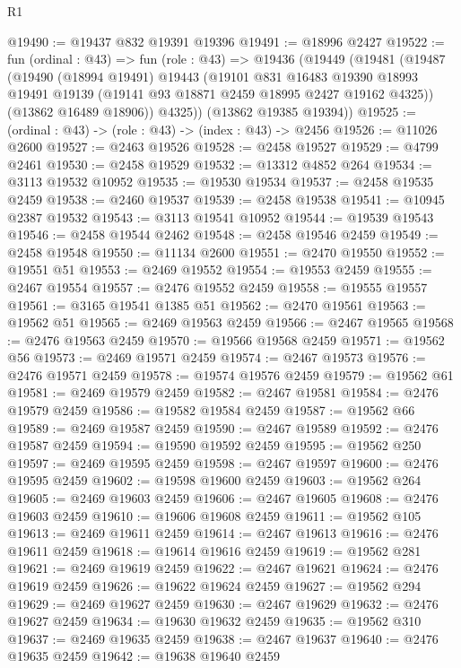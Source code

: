 \begin{lexlean}{R1}
\begin{coremodule}
@19490 := @19437 @832 @19391 @19396
@19491 := @18996 @2427
@19522 := fun (ordinal : @43) =>
  fun (role : @43) =>
  @19436
    (@19449
      (@19481
        (@19487
          (@19490
            (@18994 @19491)
            @19443
            (@19101
              @831
              @16483
              @19390
              @18993
              @19491
              @19139
              (@19141 @93 @18871 @2459 @18995 @2427 @19162 @4325))
            (@13862 @16489 @18906))
          @4325))
      (@13862 @19385 @19394))
@19525 := (ordinal : @43) -> (role : @43) -> (index : @43) -> @2456
@19526 := @11026 @2600
@19527 := @2463 @19526
@19528 := @2458 @19527
@19529 := @4799 @2461
@19530 := @2458 @19529
@19532 := @13312 @4852 @264
@19534 := @3113 @19532 @10952
@19535 := @19530 @19534
@19537 := @2458 @19535 @2459
@19538 := @2460 @19537
@19539 := @2458 @19538
@19541 := @10945 @2387 @19532
@19543 := @3113 @19541 @10952
@19544 := @19539 @19543
@19546 := @2458 @19544 @2462
@19548 := @2458 @19546 @2459
@19549 := @2458 @19548
@19550 := @11134 @2600
@19551 := @2470 @19550
@19552 := @19551 @51
@19553 := @2469 @19552
@19554 := @19553 @2459
@19555 := @2467 @19554
@19557 := @2476 @19552 @2459
@19558 := @19555 @19557
@19561 := @3165 @19541 @1385 @51
@19562 := @2470 @19561
@19563 := @19562 @51
@19565 := @2469 @19563 @2459
@19566 := @2467 @19565
@19568 := @2476 @19563 @2459
@19570 := @19566 @19568 @2459
@19571 := @19562 @56
@19573 := @2469 @19571 @2459
@19574 := @2467 @19573
@19576 := @2476 @19571 @2459
@19578 := @19574 @19576 @2459
@19579 := @19562 @61
@19581 := @2469 @19579 @2459
@19582 := @2467 @19581
@19584 := @2476 @19579 @2459
@19586 := @19582 @19584 @2459
@19587 := @19562 @66
@19589 := @2469 @19587 @2459
@19590 := @2467 @19589
@19592 := @2476 @19587 @2459
@19594 := @19590 @19592 @2459
@19595 := @19562 @250
@19597 := @2469 @19595 @2459
@19598 := @2467 @19597
@19600 := @2476 @19595 @2459
@19602 := @19598 @19600 @2459
@19603 := @19562 @264
@19605 := @2469 @19603 @2459
@19606 := @2467 @19605
@19608 := @2476 @19603 @2459
@19610 := @19606 @19608 @2459
@19611 := @19562 @105
@19613 := @2469 @19611 @2459
@19614 := @2467 @19613
@19616 := @2476 @19611 @2459
@19618 := @19614 @19616 @2459
@19619 := @19562 @281
@19621 := @2469 @19619 @2459
@19622 := @2467 @19621
@19624 := @2476 @19619 @2459
@19626 := @19622 @19624 @2459
@19627 := @19562 @294
@19629 := @2469 @19627 @2459
@19630 := @2467 @19629
@19632 := @2476 @19627 @2459
@19634 := @19630 @19632 @2459
@19635 := @19562 @310
@19637 := @2469 @19635 @2459
@19638 := @2467 @19637
@19640 := @2476 @19635 @2459
@19642 := @19638 @19640 @2459

\end{coremodule}
\end{lexlean}
